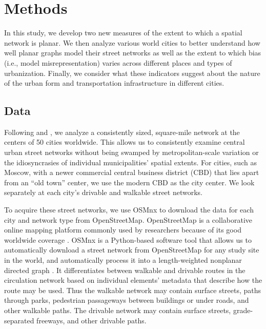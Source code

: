 \documentclass[Afour,sageh,times]{sagej}
\begin{document}
\section{Methods}

In this study, we develop two new measures of the extent to which a spatial network is planar. We then analyze various world cities to better understand how well planar graphs model their street networks as well as the extent to which bias (i.e., model misrepresentation) varies across different places and types of urbanization. Finally, we consider what these indicators suggest about the nature of the urban form and transportation infrastructure in different cities.

\subsection{Data}

Following \citet{jacobs_great_1995} and \citet{cardillo_structural_2006}, we analyze a consistently sized, square-mile network at the centers of 50 cities worldwide. This allows us to consistently examine central urban street networks without being swamped by metropolitan-scale variation or the idiosyncrasies of individual municipalities' spatial extents. For cities, such as Moscow, with a newer commercial central business district (CBD) that lies apart from an \enquote{old town} center, we use the modern CBD as the city center. We look separately at each city's drivable and walkable street networks.

To acquire these street networks, we use OSMnx to download the data for each city and network type from OpenStreetMap. OpenStreetMap is a collaborative online mapping platform commonly used by researchers because of its good worldwide coverage \citep{haklay_how_2010,jokar_arsanjani_openstreetmap_2015}. OSMnx is a Python-based software tool that allows us to automatically download a street network from OpenStreetMap for any study site in the world, and automatically process it into a length-weighted nonplanar directed graph \citep{boeing_osmnx:_2017}. It differentiates between walkable and drivable routes in the circulation network based on individual elements' metadata that describe how the route may be used. Thus the walkable network may contain surface streets, paths through parks, pedestrian passageways between buildings or under roads, and other walkable paths. The drivable network may contain surface streets, grade-separated freeways, and other drivable paths.
\end{document}
